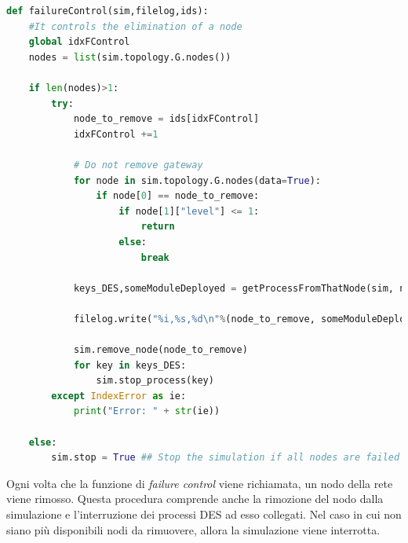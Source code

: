 \begin{lstlisting}[language=python, caption={Funzione di \textit{failure control}.}, label={lst:failure_control}, captionpos=b]
def failureControl(sim,filelog,ids):
    #It controls the elimination of a node
    global idxFControl
    nodes = list(sim.topology.G.nodes())

    if len(nodes)>1:
        try:
            node_to_remove = ids[idxFControl]
            idxFControl +=1
            
            # Do not remove gateway 
            for node in sim.topology.G.nodes(data=True):
                if node[0] == node_to_remove:
                    if node[1]["level"] <= 1:
                        return
                    else: 
                        break

            keys_DES,someModuleDeployed = getProcessFromThatNode(sim, node_to_remove)

            filelog.write("%i,%s,%d\n"%(node_to_remove, someModuleDeployed,sim.env.now))

            sim.remove_node(node_to_remove)
            for key in keys_DES:
                sim.stop_process(key)
        except IndexError as ie:
            print("Error: " + str(ie))

    else:
        sim.stop = True ## Stop the simulation if all nodes are failed
\end{lstlisting}

Ogni volta che la funzione di \textit{failure control} viene richiamata, un nodo della rete viene rimosso. Questa procedura comprende anche la rimozione del nodo dalla simulazione e l'interruzione dei processi DES ad esso collegati. Nel caso in cui non siano più disponibili nodi da rimuovere, allora la simulazione viene interrotta.


